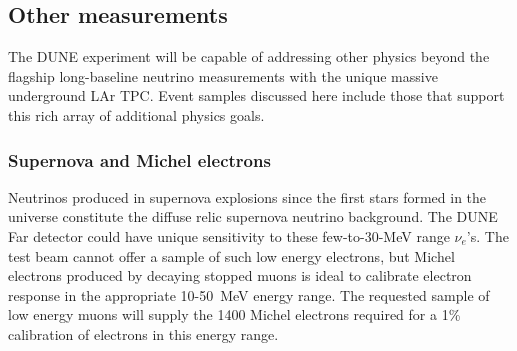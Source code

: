 





\subsection{Other measurements} 
\label{sec_other}

The DUNE experiment will be capable of addressing other physics beyond the flagship long-baseline neutrino measurements with the unique massive underground LAr TPC. Event samples discussed here include those that support this rich array of additional physics goals.


\subsubsection{Supernova and Michel electrons}

Neutrinos produced in supernova explosions since the first stars formed in the universe constitute the
diffuse relic supernova neutrino background. The DUNE Far detector could have unique sensitivity to these
few-to-30-MeV range $\nu_e$'s. 
The test beam cannot offer a sample of  such low energy electrons, but Michel electrons  produced by 
decaying stopped muons is ideal to calibrate electron response in the appropriate 10-50~MeV energy range. 
The requested sample of low energy muons will supply the 1400 Michel electrons required for a 1\% 
calibration of electrons in this energy range. 


